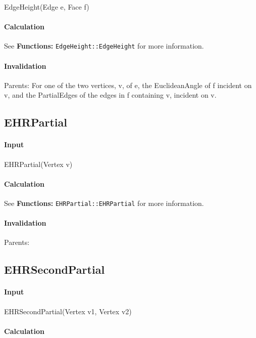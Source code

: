 EdgeHeight(Edge e, Face f)

\paragraph{Calculation}

See \textbf{Functions: }\texttt{EdgeHeight::EdgeHeight} for more information.

\paragraph{Invalidation}

Parents: For one of the two vertices, v,  of e, the EuclideanAngle of f
incident on v, and the PartialEdges of the edges in f containing v, incident
on v.

\bigskip

\subsection{EHRPartial}

\paragraph{Input}

EHRPartial(Vertex v)

\paragraph{Calculation}

See \textbf{Functions: }\texttt{EHRPartial::EHRPartial} for more information.

\paragraph{Invalidation}

Parents: 

\bigskip

\subsection{EHRSecondPartial}

\paragraph{Input}

EHRSecondPartial(Vertex v1, Vertex v2)

\paragraph{Calculation}

